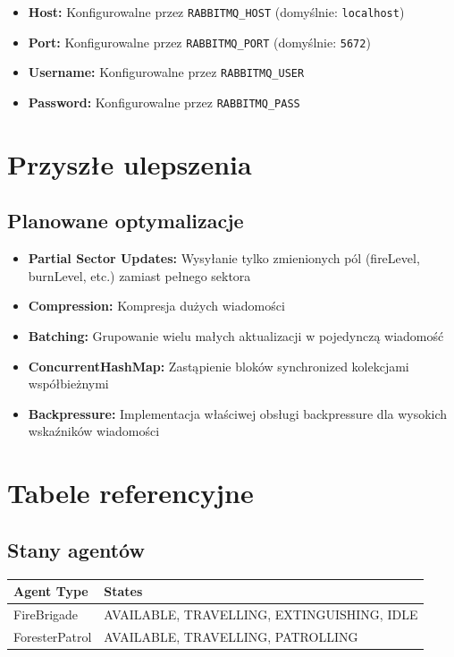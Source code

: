 \documentclass[11pt,a4paper] {article}
\begin{document}
\begin{itemize}
    \item \textbf{Host:} Konfigurowalne przez \texttt{RABBITMQ\_HOST} (domyślnie: \texttt{localhost})
    \item \textbf{Port:} Konfigurowalne przez \texttt{RABBITMQ\_PORT} (domyślnie: \texttt{5672})
    \item \textbf{Username:} Konfigurowalne przez \texttt{RABBITMQ\_USER}
    \item \textbf{Password:} Konfigurowalne przez \texttt{RABBITMQ\_PASS}
\end{itemize}

\section{Przyszłe ulepszenia}

\subsection{Planowane optymalizacje}

\begin{itemize}
    \item \textbf{Partial Sector Updates:} Wysyłanie tylko zmienionych pól (fireLevel, burnLevel, etc.) zamiast pełnego sektora
    \item \textbf{Compression:} Kompresja dużych wiadomości
    \item \textbf{Batching:} Grupowanie wielu małych aktualizacji w pojedynczą wiadomość
    \item \textbf{ConcurrentHashMap:} Zastąpienie bloków synchronized kolekcjami współbieżnymi
    \item \textbf{Backpressure:} Implementacja właściwej obsługi backpressure dla wysokich wskaźników wiadomości
\end{itemize}

\section{Tabele referencyjne}

\subsection{Stany agentów}

\begin{longtable}{|l|l|}
\hline
\textbf{Agent Type} & \textbf{States} \\
\hline
FireBrigade & AVAILABLE, TRAVELLING, EXTINGUISHING, IDLE \\
\hline
ForesterPatrol & AVAILABLE, TRAVELLING, PATROLLING \\
\hline
\end{longtable}
\end{document}
